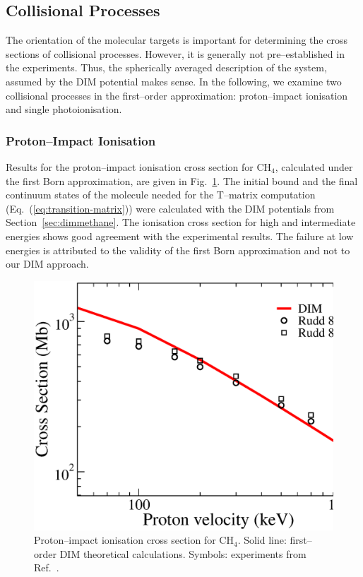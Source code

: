 \documentclass[10pt]{article}
\begin{document}
\subsection{Collisional Processes}

The orientation of the molecular targets is important for determining
the cross sections of collisional processes. However, it is generally 
not pre--established in the experiments. Thus, the spherically 
averaged description of the system, assumed by the DIM potential 
makes sense. In the following, we examine two collisional processes 
in the first--order approximation: proton--impact ionisation and 
single photoionisation. 

\subsubsection{Proton--Impact Ionisation}

Results for the proton--impact ionisation cross section for CH$_4$,
calculated under the first Born approximation, are given in 
Fig.~\ref{fig:ionch4}. The initial bound and the final continuum 
states of the molecule needed for the T--matrix computation 
(Eq.~(\ref{eq:transition-matrix})) were calculated with the DIM 
potentials from Section~\ref{sec:dimmethane}. The ionisation cross 
section for high and intermediate energies shows good agreement with 
the experimental results. The failure at low energies is attributed 
to the validity of the first Born approximation and not to our DIM 
approach.

\begin{figure}[H]
\centering
\includegraphics[height=0.23\textheight]{figures/dimpot/born_ionch4.eps}
\caption{Proton--impact ionisation cross section for CH$_4$. Solid 
line: first--order DIM theoretical calculations. Symbols: experiments 
from Ref.~\cite{Rudd1983,Rudd1985}.}
\label{fig:ionch4}
\end{figure}
\end{document}
